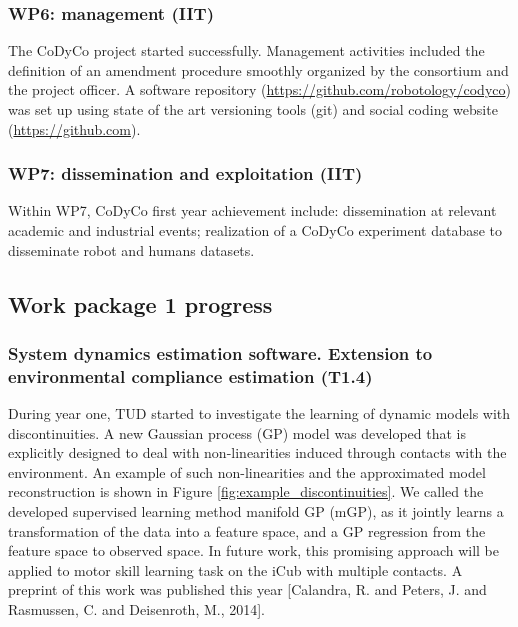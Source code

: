 \documentclass[12pt,a4paper,twoside]{article}
\begin{document}
\subsubsection{WP6: management (IIT)}

The CoDyCo project started successfully. Management activities included the definition of an amendment procedure smoothly organized by the consortium and the project officer. A software repository (\url{https://github.com/robotology/codyco}) was set up using state of the art versioning tools (git) and social coding website (\url{https://github.com}). 

\subsubsection{WP7: dissemination and exploitation (IIT)}

Within WP7, CoDyCo first year achievement include: dissemination at relevant academic and industrial events; realization of a CoDyCo experiment database to disseminate robot and humans datasets. 

\subsection{Work package 1 progress}

\subsubsection{System dynamics estimation software. Extension to
environmental compliance estimation (T1.4)}

During year one, TUD started to investigate the learning of dynamic models with
discontinuities. A new Gaussian process (GP) model was developed
that is explicitly designed to deal with non-linearities
induced through contacts with the environment. An example of such non-linearities 
and the approximated model reconstruction is shown in Figure \ref{fig:example_discontinuities}.
We called the developed supervised learning method manifold GP (mGP), as it 
jointly learns a transformation of the data into a feature space, and a GP regression 
 from the feature space to observed space. In future work, this promising approach 
 will be applied to motor skill learning task on the iCub with multiple contacts. 
 A preprint of this work was published this year [Calandra, R. and Peters, J. and Rasmussen, C. and Deisenroth,
M., 2014].
\end{document}

